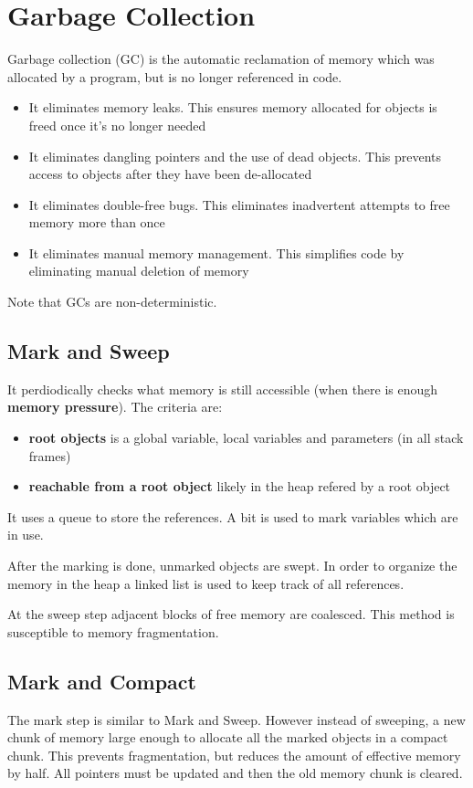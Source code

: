 \section{Garbage Collection}
Garbage collection (GC) is the automatic reclamation of memory which was
allocated by a program, but is no longer referenced in code.
\begin{itemize}
  \item It eliminates memory leaks. This ensures memory allocated for
  objects is freed once it’s no longer needed
  \item It eliminates dangling pointers and the use of dead objects.
  This prevents access to objects after they have been de-allocated
  \item It eliminates double-free bugs. This eliminates inadvertent
  attempts to free memory more than once
  \item It eliminates manual memory management. This simplifies code by
  eliminating manual deletion of memory
\end{itemize}
Note that GCs are non-deterministic.

\subsection*{Mark and Sweep}
It perdiodically checks what memory is still accessible (when there is
enough \textbf{memory pressure}). The criteria are:
\begin{itemize}
  \item \textbf{root objects} is a global variable, local variables and
  parameters (in all stack frames)
  \item \textbf{reachable from a root object} likely in the heap refered
  by a root object
\end{itemize}

It uses a queue to store the references. A bit is used to mark variables
which are in use.

After the marking is done, unmarked objects are swept. In order to
organize the memory in the heap a linked list is used to keep track of
all references.

At the sweep step adjacent blocks of free memory are coalesced. This
method is susceptible to memory fragmentation.

\subsection*{Mark and Compact}
The mark step is similar to Mark and Sweep. However instead of sweeping,
a new chunk of memory large enough to allocate all the marked objects in
a compact chunk. This prevents fragmentation, but reduces the amount of
effective memory by half. All pointers must be updated and then the old
memory chunk is cleared.

